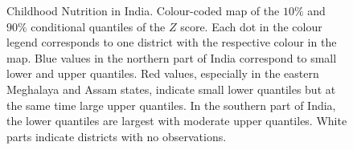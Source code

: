 \begin{figure}
\begin{center}
\begin{picture}
  \end{picture}
\end{center}
\caption{Childhood Nutrition in India. Colour-coded map of the $10\%$ and $90\%$
         conditional quantiles of the $Z$ score. Each dot in the colour legend
         corresponds to one district with the respective colour in the map.
         Blue values in the northern part
         of India correspond to small lower and upper quantiles. Red values,
         especially in the eastern Meghalaya and Assam states, indicate small
         lower quantiles but at the same time large upper quantiles. In the southern part
         of India, the lower quantiles are largest with moderate upper quantiles.
         White parts indicate districts with no observations.
         \label{india_qplot}}
\end{figure}
